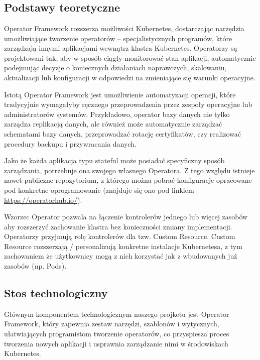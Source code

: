 \documentclass[polish]{aghengthesis}
\begin{document}
\chapter{\ChapterTitleTechStack}

\section{Podstawy teoretyczne}

Operator Framework rozszerza możliwości Kubernetes, dostarczając narzędzia umożliwiające tworzenie operatorów – specjalistycznych programów, które zarządzają innymi aplikacjami wewnątrz klastra Kubernetes. Operatorzy są projektowani tak, aby w sposób ciągły monitorować stan aplikacji, automatycznie podejmując decyzje o koniecznych działaniach naprawczych, skalowaniu, aktualizacji lub konfiguracji w odpowiedzi na zmieniające się warunki operacyjne.

Istotą Operator Framework jest umożliwienie automatyzacji operacji, które tradycyjnie wymagałyby ręcznego przeprowadzenia przez zespoły operacyjne lub administratorów systemów. Przykładowo, operator bazy danych nie tylko zarządza replikacją danych, ale również może automatycznie zarządzać schematami bazy danych, przeprowadzać rotację certyfikatów, czy realizować procedury backupu i przywracania danych.

Jako że każda aplikacja typu stateful może posiadać specyficzny sposób zarządzania, potrzebuje ona swojego własnego Operatora. Z tego względu istnieje nawet publiczne repozytorium, z którego można pobrać konfiguracje opracowane pod konkretne oprogramowanie (znajduje się ono pod linkiem \url{https://operatorhub.io/}).

Wzorzec Operator pozwala na łączenie kontrolerów jednego lub więcej zasobów aby rozszerzyć zachowanie klastra bez konieczności zmiany implementacji. Operatorzy przyjmują rolę kontrolerów dla tzw. Custom Resource. Custom Resource rozszerzają / personalizują konkretne instalacje Kubernetesa, z tym zachowaniem że użytkownicy mogą z nich korzystać jak z wbudowanych już zasobów (np. Pods). \cite{operatorpattern}

\section{Stos technologiczny}

Głównym komponentem technologicznym naszego projketu jest Operator Framework, który zapewnia zestaw narzędzi, szablonów i wytycznych, ułatwiających programistom tworzenie operatorów, co przyspiesza proces tworzenia nowych aplikacji i usprawnia zarządzanie nimi w środowiskach Kubernetes.
\end{document}
